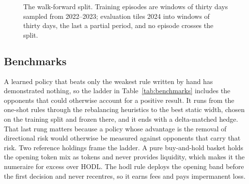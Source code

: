 \begin{figure}[tbp]
\centering
{}
\caption{The walk-forward split. Training episodes are windows of thirty days
sampled from 2022--2023; evaluation tiles 2024 into windows of thirty days, the
last a partial period, and no episode crosses the split.}
\label{fig:split}
\end{figure}

\subsection{Benchmarks}

A learned policy that beats only the weakest rule written by hand has
demonstrated nothing, so the ladder in Table~\ref{tab:benchmarks} includes the
opponents that could otherwise account for a positive result. It runs from the
one-shot rules through the rebalancing heuristics to the best static width,
chosen on the training split and frozen there, and it ends with a delta-matched
hedge. That last rung matters because a policy whose advantage is the removal
of directional risk would otherwise be measured against opponents that carry
that risk. Two reference holdings frame the ladder. A pure buy-and-hold basket
holds the opening token mix as tokens and never provides liquidity, which makes
it the numeraire for excess over HODL. The \textsf{hodl} rule deploys the
opening band before the first decision and never recentres, so it earns fees
and pays impermanent loss.

